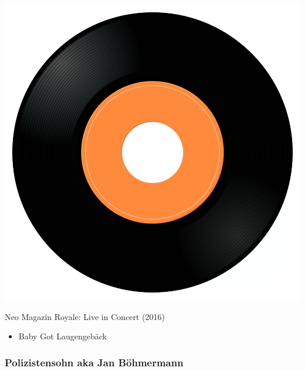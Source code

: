 \begin{minipage}[t]{0.25\textwidth}\vspace{0pt}
\captionsetup{type=figure}
\includegraphics[width=\textwidth]{Images/cover.png}
\caption*{Neo Magazin Royale: Live in Concert (2016)}
\end{minipage}
\begin{minipage}[t]{0.25\textwidth}\vspace{0pt}
\begin{itemize}[nosep,leftmargin=1em,labelwidth=*,align=left]
	\setlength{\itemsep}{0pt}
	\item Baby Got Laugengebäck
\end{itemize}
\end{minipage}

\subsubsection{Polizistensohn aka Jan Böhmermann}

